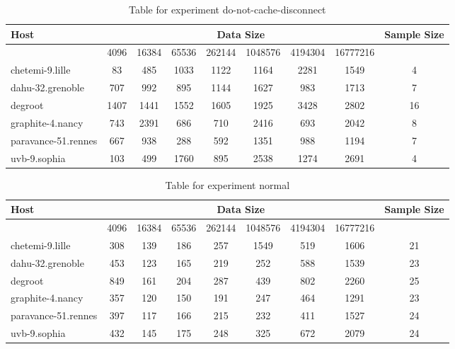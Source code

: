 \begin{table}
\caption{Table for experiment do-not-cache-disconnect}
\begin{tabular}{@{}lcccccccc@{}}
\toprule
Host    & \multicolumn{7}{c}{Data Size}          & Sample Size \\ \midrule
& 4096  & 16384  & 65536  & 262144  & 1048576  & 4194304  & 16777216              \\ \midrule
chetemi-9.lille  & 83  & 485  & 1033  & 1122  & 1164  & 2281  & 1549  & 4 \\
dahu-32.grenoble  & 707  & 992  & 895  & 1144  & 1627  & 983  & 1713  & 7 \\
degroot  & 1407  & 1441  & 1552  & 1605  & 1925  & 3428  & 2802  & 16 \\
graphite-4.nancy  & 743  & 2391  & 686  & 710  & 2416  & 693  & 2042  & 8 \\
paravance-51.rennes  & 667  & 938  & 288  & 592  & 1351  & 988  & 1194  & 7 \\
uvb-9.sophia  & 103  & 499  & 1760  & 895  & 2538  & 1274  & 2691  & 4 \\
\bottomrule
\end{tabular}
\end{table}

\begin{table}
\caption{Table for experiment normal}
\begin{tabular}{@{}lcccccccc@{}}
\toprule
Host    & \multicolumn{7}{c}{Data Size}          & Sample Size \\ \midrule
& 4096  & 16384  & 65536  & 262144  & 1048576  & 4194304  & 16777216              \\ \midrule
chetemi-9.lille  & 308  & 139  & 186  & 257  & 1549  & 519  & 1606  & 21 \\
dahu-32.grenoble  & 453  & 123  & 165  & 219  & 252  & 588  & 1539  & 23 \\
degroot  & 849  & 161  & 204  & 287  & 439  & 802  & 2260  & 25 \\
graphite-4.nancy  & 357  & 120  & 150  & 191  & 247  & 464  & 1291  & 23 \\
paravance-51.rennes  & 397  & 117  & 166  & 215  & 232  & 411  & 1527  & 24 \\
uvb-9.sophia  & 432  & 145  & 175  & 248  & 325  & 672  & 2079  & 24 \\
\bottomrule
\end{tabular}
\end{table}

